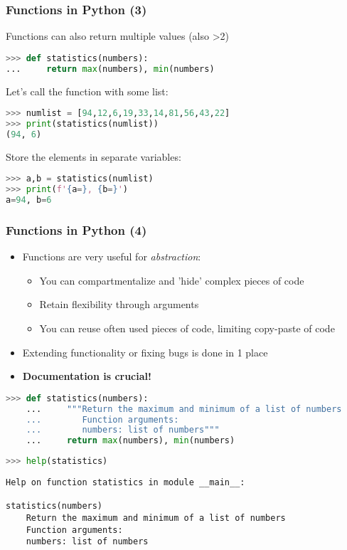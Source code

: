 \begin{frame}[fragile]
  \frametitle{Functions in Python (3)}
  Functions can also return multiple values (also >2)
  \begin{lstlisting}[language=Python, numbers=none]
>>> def statistics(numbers):
...     return max(numbers), min(numbers)
  \end{lstlisting}\pause
  Let's call the function with some list:
  \begin{lstlisting}[language=Python, numbers=none]
>>> numlist = [94,12,6,19,33,14,81,56,43,22]
>>> print(statistics(numlist))
(94, 6)
  \end{lstlisting}\pause
  Store the elements in separate variables:
  \begin{lstlisting}[language=Python, numbers=none]
>>> a,b = statistics(numlist)
>>> print(f'{a=}, {b=}')
a=94, b=6
  \end{lstlisting}\pause
\end{frame}

\begin{frame}[fragile]
  \frametitle{Functions in Python (4)}
  \begin{itemize}
    \item Functions are very useful for \emph{abstraction}:
    \begin{itemize}
      \item You can compartmentalize and 'hide' complex pieces of code\
      \item Retain flexibility through arguments
      \item You can reuse often used pieces of code, limiting copy-paste of code
    \end{itemize}
    \item Extending functionality or fixing bugs is done in 1 place\pause
    \item \bfseries{Documentation is crucial!}
  \end{itemize}
  \begin{lstlisting}[language=Python, numbers=none]
    >>> def statistics(numbers):
    ...     """Return the maximum and minimum of a list of numbers
    ...        Function arguments:
    ...        numbers: list of numbers"""
    ...     return max(numbers), min(numbers)
  \end{lstlisting}\pause
  \begin{lstlisting}[language=Python, numbers=none]
>>> help(statistics)
  \end{lstlisting}
  \begin{lstlisting}[style=PyOutput,keywords={statistics},keywordstyle=\bfseries]
Help on function statistics in module __main__:

statistics(numbers)
    Return the maximum and minimum of a list of numbers
    Function arguments:
    numbers: list of numbers
  \end{lstlisting}
\end{frame}



